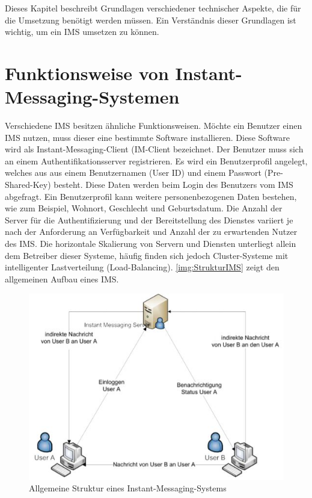\documentclass[a4paper,titlepage,halfparskip,12pt]{scrreprt}
\begin{document}
\begin{onehalfspacing}
Dieses Kapitel beschreibt Grundlagen verschiedener technischer Aspekte, die für die Umsetzung benötigt werden müssen. Ein Verständnis dieser Grundlagen ist wichtig, um ein \acs{IMS} umsetzen zu können.

\section{Funktionsweise von Instant-Messaging-Systemen}
\label{sec:IMSFunktion}

Verschiedene \ac{IMS} besitzen ähnliche Funktionsweisen. Möchte ein Benutzer einen \ac{IMS} nutzen, muss dieser eine bestimmte Software installieren. Diese Software wird als Instant-Messaging-Client (IM-Client bezeichnet. Der Benutzer muss sich an einem Authentifikationsserver registrieren. Es wird ein Benutzerprofil angelegt, welches aus aus einem Benutzernamen (User ID) und einem Passwort (Pre-Shared-Key) besteht. Diese Daten werden beim Login des Benutzers vom \ac{IMS} abgefragt. Ein Benutzerprofil kann weitere personenbezogenen Daten bestehen, wie zum Beispiel, Wohnort, Geschlecht und Geburtsdatum. Die Anzahl der Server für die Authentifizierung und der Bereitstellung des Dienstes variiert je nach der Anforderung an Verfügbarkeit und Anzahl der zu erwartenden Nutzer des \ac{IMS}. Die horizontale Skalierung von Servern und Diensten unterliegt allein dem Betreiber dieser Systeme, häufig finden sich jedoch Cluster-Systeme mit intelligenter Lastverteilung (Load-Balancing). \autoref{img:StrukturIMS} zeigt den allgemeinen Aufbau eines \ac{IMS}.\cite{anastasiaIMS}

\begin{figure}[h]
	\centering
	\includegraphics[width=.65\textwidth]{images/GrundlegendeStrukturIMS}
	\caption{Allgemeine Struktur eines Instant-Messaging-Systems \cite{anastasiaIMS}}
	\label{img:StrukturIMS}
\end{figure}


\end{onehalfspacing}
\end{document}
